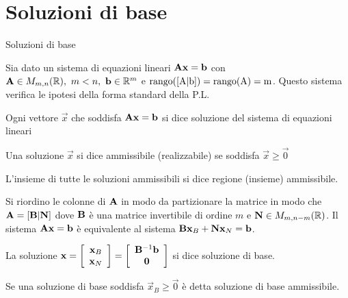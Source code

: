 \documentclass{beamer}
\begin{document}
\section{Soluzioni di base}

\begin{frame}[allowframebreaks]{Soluzioni di base}

Sia dato un sistema di equazioni lineari $\mathbf{A}\mathbf{x}  = \mathbf{b}$ con $\matr{A} \in M_{m,n}(\mathbb{R}),\ m < n,\ \vec{b} \in \mathbb{R}^m$ e
$\rm rango ([A|b] ) = \rm rango (A ) = m$. Questo sistema verifica le ipotesi della forma standard della P.L.

\begin{definition}[soluzione]
  Ogni vettore $\vec{x}$ che soddisfa $\mathbf{A}\mathbf{x}  = \mathbf{b}$ si dice soluzione del sistema di equazioni lineari
\end{definition}

\begin{definition}
    Una soluzione $\vec{x}$ si dice ammissibile (realizzabile) se soddisfa
    $\vec{x} \geq \vec{0}$
\end{definition}

\framebreak

\begin{definition}
  L’insieme di tutte le soluzioni ammissibili si dice regione (insieme) ammissibile.
\end{definition}

\begin{definition}
  Si riordino le colonne di $\mathbf{A}$ in modo da partizionare la matrice in modo che $\mathbf{A} = [\mathbf{B|N}]$ dove $\mathbf{B}$ \`e una matrice invertibile di ordine $m$ e $\mathbf{N} \in M_{m,n-m}(\mathbb{R})$. Il sistema $\mathbf{A}\mathbf{x}  = \mathbf{b}$ \`e equivalente al sistema $\mathbf{B} \mathbf{x}_B + \mathbf{N} \mathbf{x}_N  = \mathbf{b}$.

 La soluzione $\mathbf{x}=\left[\begin{array}{c}\mathbf{x}_B\\ \mathbf{x}_N\end{array}\right]=\left[\begin{array}{c}\mathbf{B}^{-1}\mathbf{b}\\ \mathbf{0}\end{array}\right]$ si dice soluzione di base.
 \end{definition}

 \framebreak

\begin{definition}
  Se una soluzione di base soddisfa $\vec{x}_B \geq \vec{0}$ \`e detta soluzione di base ammissibile.
 \end{definition}


\end{frame}
\end{document}
